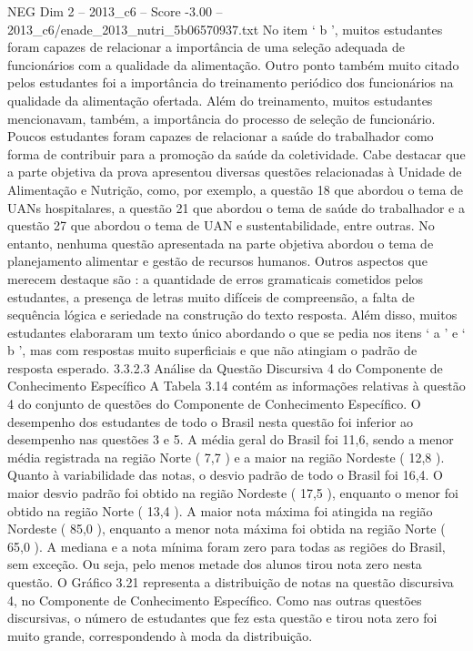\begin{textsample}{NEG Dim 2 – 2013\_c6 – Score -3.00 – 2013\_c6/enade\_2013\_nutri\_5b06570937.txt}
No item ‘ b ’, muitos estudantes foram capazes de relacionar a importância de uma seleção adequada de funcionários com a qualidade da alimentação.
Outro ponto também muito citado pelos estudantes foi a importância do treinamento periódico dos funcionários na qualidade da alimentação ofertada.
Além do treinamento, muitos estudantes mencionavam, também, a importância do processo de seleção de funcionário.
Poucos estudantes foram capazes de relacionar a saúde do trabalhador como forma de contribuir para a promoção da saúde da coletividade.
Cabe destacar que a parte objetiva da prova apresentou diversas questões relacionadas à Unidade de Alimentação e Nutrição, como, por exemplo, a questão 18 que abordou o tema de UANs hospitalares, a questão 21 que abordou o tema de saúde do trabalhador e a questão 27 que abordou o tema de UAN e sustentabilidade, entre outras.
No entanto, nenhuma questão apresentada na parte objetiva abordou o tema de planejamento alimentar e gestão de recursos humanos.
Outros aspectos que merecem destaque são : a quantidade de erros gramaticais cometidos pelos estudantes, a presença de letras muito difíceis de compreensão, a falta de sequência lógica e seriedade na construção do texto resposta.
Além disso, muitos estudantes elaboraram um texto único abordando o que se pedia nos itens ‘ a ’ e ‘ b ’, mas com respostas muito superficiais e que não atingiam o padrão de resposta esperado. 3.3.2.3 Análise da Questão Discursiva 4 do Componente de Conhecimento Específico A Tabela 3.14 contém as informações relativas à questão 4 do conjunto de questões do Componente de Conhecimento Específico.
O desempenho dos estudantes de todo o Brasil nesta questão foi inferior ao desempenho nas questões 3 e 5.
A média geral do Brasil foi 11,6, sendo a menor média registrada na região Norte ( 7,7 ) e a maior na região Nordeste ( 12,8 ).
Quanto à variabilidade das notas, o desvio padrão de todo o Brasil foi 16,4.
O maior desvio padrão foi obtido na região Nordeste ( 17,5 ), enquanto o menor foi obtido na região Norte ( 13,4 ).
A maior nota máxima foi atingida na região Nordeste ( 85,0 ), enquanto a menor nota máxima foi obtida na região Norte ( 65,0 ).
A mediana e a nota mínima foram zero para todas as regiões do Brasil, sem exceção.
Ou seja, pelo menos metade dos alunos tirou nota zero nesta questão.
O Gráfico 3.21 representa a distribuição de notas na questão discursiva 4, no Componente de Conhecimento Específico.
Como nas outras questões discursivas, o número de estudantes que fez esta questão e tirou nota zero foi muito grande, correspondendo à moda da distribuição.

\end{textsample}
